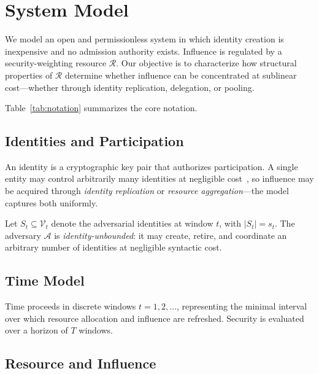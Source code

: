 \documentclass[manuscript,review]{acmart}
\theoremstyle{remark}
\begin{document}
	
	\section{System Model}
	\label{sec:model}
	
	We model an open and permissionless system in which
	identity creation is inexpensive and no admission
	authority exists.
	Influence is regulated by a security-weighting resource
	$\mathcal{R}$.
	Our objective is to characterize how structural
	properties of $\mathcal{R}$ determine whether influence
	can be concentrated at sublinear cost---whether through
	identity replication, delegation, or pooling.
	
	Table~\ref{tab:notation} summarizes the core notation.
	
	
	\subsection{Identities and Participation}
	\label{ssec:identity}
	
	An identity is a cryptographic key pair that authorizes
	participation.
	A single entity may control arbitrarily many identities
	at negligible cost~\cite{douceur2002sybil}, so influence
	may be acquired through \emph{identity replication} or
	\emph{resource aggregation}---the model captures both
	uniformly.
	
	Let $S_t \subseteq \mathcal{V}_t$ denote the adversarial
	identities at window $t$, with $|S_t| = s_t$.
	The adversary $\mathcal{A}$ is \emph{identity-unbounded}:
	it may create, retire, and coordinate an arbitrary
	number of identities at negligible syntactic cost.
	
	\subsection{Time Model}
	\label{ssec:time}
	
	Time proceeds in discrete windows $t = 1, 2, \ldots$,
	representing the minimal interval over which resource
	allocation and influence are refreshed.
	Security is evaluated over a horizon of $T$ windows.
	
	\subsection{Resource and Influence}
	\label{ssec:resource}
	
\end{document}
